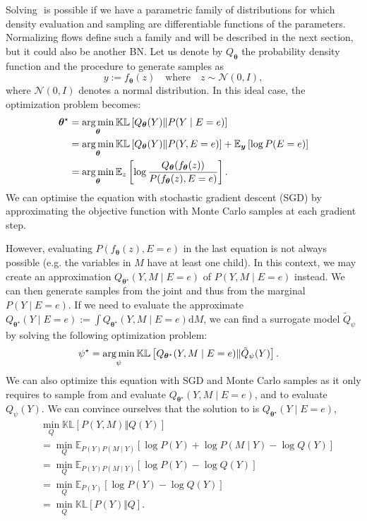 Solving $\label{eq:obj_VI}$ is possible if we have a parametric family of distributions for which density evaluation and sampling are differentiable functions of the parameters. Normalizing flows define such a family and will be described in the next section, but it could also be another BN. Let us denote by $Q_{\bm{\theta}}$ the probability density function and the procedure to generate samples as $$ y := f_{\bm{\theta}}(z) \quad\text{where}\quad z\sim \mathcal{N}(0, I),$$
where $\mathcal{N}(0, I)$ denotes a normal distribution.
In this ideal case, the optimization problem becomes:
\begin{align}
  \bm{\theta}^\star &= \operatorname*{arg\,min}_{\bm{\theta}} \mathbb{KL}\left[Q_{\bm{\theta}}(Y)\Vert P(Y\mid E=e) \right]\\ \label{eq:VI_optim}
  &= \operatorname*{arg\,min}_{\bm{\theta}} \mathbb{KL}\left[Q_{\bm{\theta}}(Y)\Vert P(Y, E=e) \right] + \mathbb{E}_{\bm y}\left[\log P(E=e)\right]\\
  &= \operatorname*{arg\,min}_{\bm{\theta}} \mathbb{E}_{z}\left[ \log \frac{Q_{\bm{\theta}}(f_{\bm{\theta}}(z))}{P(f_{\bm{\theta}}(z), E=e)} \right].
\end{align}
We can optimise the equation with stochastic gradient descent (SGD) by approximating the objective function with Monte Carlo samples at each gradient step.

However, evaluating $P(f_{\bm{\theta}}(z), E=e)$ in the last equation is not always possible (e.g. the variables in $M$ have at least one child). In this context, we may create an approximation $Q_{\bm{\theta}^\star}(Y, M\mid E=e)$ of $P(Y, M\mid E=e)$ instead. We can then generate samples from the joint and thus from the marginal $P(Y\mid E=e)$. If we need to evaluate the approximate $Q_{\bm{\theta}^\star}(Y\mid E=e) := \int Q_{\bm{\theta}^\star}(Y, M\mid E=e) \text{d}M$, we can find a surrogate model $\tilde Q_\psi$ by solving the following optimization problem:
\begin{align}
  \psi^\star &= \operatorname*{arg\,min}_\psi \mathbb{KL}\left[Q_{\bm{\theta}^\star}(Y, M\mid E=e)\Vert \tilde Q_\psi(Y) \right]. \label{eq:approx_posterior}
\end{align}
We can also optimize this equation with SGD and Monte Carlo samples as it only requires to sample from and evaluate $Q_{\bm{\theta}^\star}(Y, M\mid E=e)$, and to evaluate $Q_\psi(Y)$. We can convince ourselves that the solution to  is $Q_{\bm{\theta}^\star}(Y\mid E=e)$,
\begin{align}
  &\min_Q \mathbb{KL}\left[P(Y, M)\Vert Q(Y) \right]\\
  &=\min_Q \mathbb{E}_{P(Y) P(M\mid Y)}\left[\log P(Y) + \log P(M\mid Y) - \log Q(Y)\right]\\
  &=\min_Q \mathbb{E}_{P(Y) P(M\mid Y)}\left[\log P(Y) - \log Q(Y)\right]\\
  &= \min_Q \mathbb{E}_{P(Y)}\left[\log P(Y) - \log Q(Y)\right]\\
  &= \min_Q \mathbb{KL}\left[P(Y)\Vert Q \right].
\end{align}

